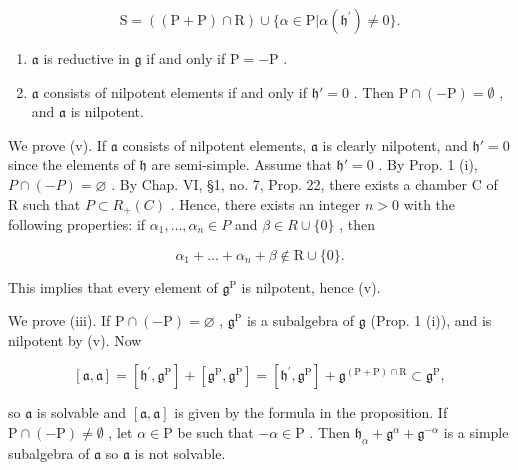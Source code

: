 \[
\mathrm{S} = ((\mathrm{P} + \mathrm{P}) \cap \mathrm{R}) \cup \{\alpha \in \mathrm{P} | \alpha (\mathfrak {h} ^ {\prime}) \neq 0 \}.
\]

\begin{enumerate}
\def\labelenumi{(\roman{enumi})}
\setcounter{enumi}{3}
\item
  \(\mathfrak{a}\) is reductive in \(\mathfrak{g}\) if and only if \(\mathrm{P} = -\mathrm{P}\) .
\item
  \(\mathfrak{a}\) consists of nilpotent elements if and only if \(\mathfrak{h}' = 0\) . Then \(\mathrm{P} \cap (-\mathrm{P}) = \emptyset\) , and \(\mathfrak{a}\) is nilpotent.
\end{enumerate}

We prove (v). If \(\mathfrak{a}\) consists of nilpotent elements, \(\mathfrak{a}\) is clearly nilpotent, and \(\mathfrak{h}' = 0\) since the elements of \(\mathfrak{h}\) are semi-simple. Assume that \(\mathfrak{h}' = 0\) . By Prop. 1 (i), \(P \cap (-P) = \varnothing\) . By Chap. VI, §1, no. 7, Prop. 22, there exists a chamber C of R such that \(P \subset R_{+}(C)\) . Hence, there exists an integer \(n > 0\) with the following properties: if \(\alpha_{1}, \ldots, \alpha_{n} \in P\) and \(\beta \in R \cup \{0\}\) , then

\[
\alpha_ {1} + \dots + \alpha_ {n} + \beta \notin \mathrm{R} \cup \{0 \}.
\]

This implies that every element of \(\mathfrak{g}^{\mathrm{P}}\) is nilpotent, hence (v).

We prove (iii). If \(\mathrm{P} \cap (-\mathrm{P}) = \varnothing\) , \(\mathfrak{g}^{\mathrm{P}}\) is a subalgebra of \(\mathfrak{g}\) (Prop. 1 (i)), and is nilpotent by (v). Now

\[
[ \mathfrak {a}, \mathfrak {a} ] = [ \mathfrak {h} ^ {\prime}, \mathfrak {g} ^ {\mathrm{P}} ] + [ \mathfrak {g} ^ {\mathrm{P}}, \mathfrak {g} ^ {\mathrm{P}} ] = [ \mathfrak {h} ^ {\prime}, \mathfrak {g} ^ {\mathrm{P}} ] + \mathfrak {g} ^ {(\mathrm{P} + \mathrm{P}) \cap \mathrm{R}} \subset \mathfrak {g} ^ {\mathrm{P}},
\]

so \(\mathfrak{a}\) is solvable and \([\mathfrak{a},\mathfrak{a}]\) is given by the formula in the proposition. If \(\mathrm{P}\cap (-\mathrm{P})\neq \emptyset\) , let \(\alpha \in \mathrm{P}\) be such that \(-\alpha \in \mathrm{P}\) . Then \(\mathfrak{h}_{\alpha} + \mathfrak{g}^{\alpha} + \mathfrak{g}^{-\alpha}\) is a simple subalgebra of \(\mathfrak{a}\) so \(\mathfrak{a}\) is not solvable.

